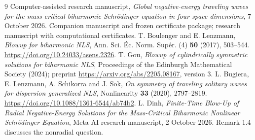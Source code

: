 \documentclass[11pt,a4paper]{article}
\theoremstyle{remark}\newtheorem{remark}[theorem]{Remark}
\begin{document}
\begin{thebibliography}{9}
 Computer-assisted research manuscript, \emph{Global negative-energy traveling waves for the mass-critical biharmonic Schr\"odinger equation in four space dimensions}, 7 October 2026. Companion manuscript and frozen certificate package; research manuscript with computational certificates.
 T. Boulenger and E. Lenzmann, \emph{Blowup for biharmonic NLS}, Ann. Sci. \'Ec. Norm. Sup\'er. (4) \textbf{50} (2017), 503--544. \url{https://doi.org/10.24033/asens.2326}.
 T. Gou, \emph{Blowup of cylindrically symmetric solutions for biharmonic NLS}, Proceedings of the Edinburgh Mathematical Society (2024); preprint \url{https://arxiv.org/abs/2205.08167}, version 3.
 L. Bugiera, E. Lenzmann, A. Schikorra and J. Sok, \emph{On symmetry of traveling solitary waves for dispersion generalized NLS}, Nonlinearity \textbf{33} (2020), 2797--2819. \url{https://doi.org/10.1088/1361-6544/ab74b2}.
 L. Dinh, \emph{Finite-Time Blow-Up of Radial Negative-Energy Solutions for the Mass-Critical Biharmonic Nonlinear Schr\"odinger Equation}, Meta AI research manuscript, 2 October 2026. Remark 1.4 discusses the nonradial question.
\end{thebibliography}
\end{document}
